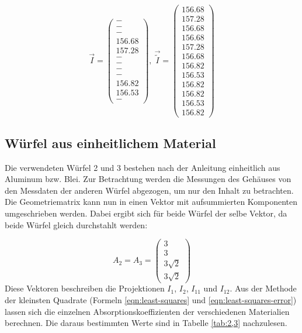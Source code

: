 \begin{equation*}
  \vec{I}=\begin{pmatrix}
        - \\
        - \\
        - \\
        156.68  \\
        157.28  \\
        - \\
        - \\
        - \\
        - \\
        156.82 \\
        156.53 \\
        -
  \end{pmatrix},\
  \vec{\tilde{I}}=\begin{pmatrix}
        156.68 \\
        157.28 \\
        156.68 \\
        156.68 \\
        157.28 \\
        156.68 \\
        156.82 \\
        156.53 \\
        156.82 \\
        156.82 \\
        156.53 \\
        156.82
  \end{pmatrix}
\end{equation*}


\subsection{Würfel aus einheitlichem Material}
Die verwendeten Würfel 2 und 3 bestehen nach der Anleitung \cite{anleitung} einheitlich aus Aluminum bzw.
Blei. Zur Betrachtung werden die Messungen des Gehäuses von den Messdaten der anderen Würfel abgezogen,
um nur den Inhalt zu betrachten. Die Geometriematrix kann nun in einen
Vektor mit aufsummierten Komponenten umgeschrieben werden. Dabei ergibt sich für beide
Würfel der selbe Vektor, da beide Würfel gleich durchstahlt werden:

\begin{equation*}
  A_2 = A_3 = \begin{pmatrix}
          3 \\
          3 \\
          3\sqrt{2} \\
          3\sqrt{2}
        \end{pmatrix}
\end{equation*}
Diese Vektoren beschreiben die Projektionen $I_1$, $I_2$, $I_{11}$ und $I_{12}$.
Aus der Methode der kleinsten Quadrate (Formeln \eqref{eqn:least-squares} und \eqref{eqn:least-squares-error})
lassen sich die einzelnen Absorptionskoeffizienten der verschiedenen Materialien berechnen.
Die daraus bestimmten Werte sind in Tabelle \ref{tab:2,3} nachzulesen.


